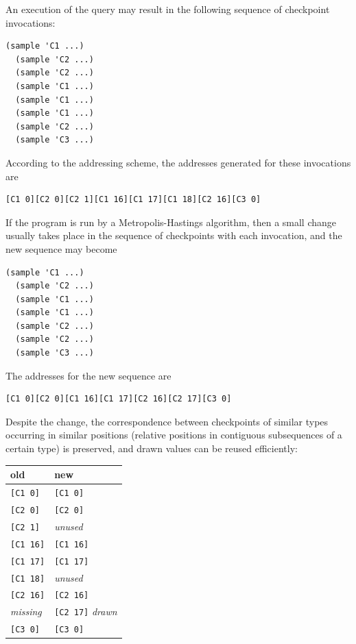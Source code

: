 \documentclass[preprint]{sigplanconf}
\begin{document}
An execution of the query may result in the following
sequence of checkpoint invocations:
\begin{lstlisting}[style=default]
  (sample 'C1 ...)
  (sample 'C2 ...)
  (sample 'C2 ...)
  (sample 'C1 ...)
  (sample 'C1 ...)
  (sample 'C1 ...)
  (sample 'C2 ...)
  (sample 'C3 ...)
\end{lstlisting}
According to the addressing scheme, the addresses generated
for these invocations are
\begin{lstlisting}[style=default]
  [C1 0][C2 0][C2 1][C1 16][C1 17][C1 18][C2 16][C3 0]
\end{lstlisting}
If the program is run by a Metropolis-Hastings algorithm, then a
small change usually takes place in the sequence of checkpoints
with each invocation, and the new sequence may become
\begin{lstlisting}[style=default]
  (sample 'C1 ...)
  (sample 'C2 ...)
  (sample 'C1 ...)
  (sample 'C1 ...)
  (sample 'C2 ...)
  (sample 'C2 ...)
  (sample 'C3 ...)
\end{lstlisting}
The addresses for the new sequence are
\begin{lstlisting}[style=default]
  [C1 0][C2 0][C1 16][C1 17][C2 16][C2 17][C3 0]
\end{lstlisting}
Despite the change, the correspondence between checkpoints of
similar types occurring in similar positions (relative positions
in contiguous subsequences of a certain type) is preserved, and
drawn values can be reused efficiently:

\vspace{\baselineskip}
{
\begin{tabular}{l l}
    \textbf{old} & \textbf{new} \\ \hline
    {}\texttt{[C1 0]} & \texttt{[C1 0]} \\
    {}\texttt{[C2 0]} & \texttt{[C2 0]} \\
    {}\texttt{[C2 1]} & \textit{unused} \\
    {}\texttt{[C1 16]} & \texttt{[C1 16]} \\
    {}\texttt{[C1 17]} & \texttt{[C1 17]} \\
    {}\texttt{[C1 18]} & \textit{unused} \\
    {}\texttt{[C2 16]} & \texttt{[C2 16]} \\
    \textit{missing} & \texttt{[C2 17]} \textit{drawn}\\
    {}\texttt{[C3 0]} & \texttt{[C3 0]}
\end{tabular}
\vspace{\baselineskip}}
\end{document}
